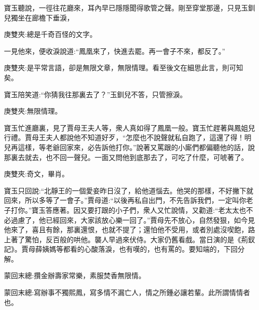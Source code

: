 \begin{parag}
    寶玉聽說，一徑往花廳來，耳內早已隱隱聞得歌管之聲。剛至穿堂那邊，只見玉釧兒獨坐在廊檐下垂淚，\begin{note}庚雙夾:總是千奇百怪的文字。\end{note}一見他來，便收淚說道:“鳳凰來了，快進去罷。再一會子不來，都反了。”\begin{note}庚雙夾:是平常言語，卻是無限文章，無限情理。看至後文在細思此言，則可知矣。\end{note}寶玉陪笑道:“你猜我往那裏去了？”玉釧兒不答，只管擦淚。\begin{note}庚雙夾:無限情理。\end{note}寶玉忙進廳裏，見了賈母王夫人等，衆人真如得了鳳凰一般。寶玉忙趕著與鳳姐兒行禮。賈母王夫人都說他不知道好歹，“怎麼也不說聲就私自跑了，這還了得！明兒再這樣，等老爺回家來，必告訴他打你。”說著又罵跟的小廝們都偏聽他的話，說那裏去就去，也不回一聲兒。一面又問他到底那去了，可吃了什麼，可唬著了。\begin{note}庚雙夾:奇文，畢肖。\end{note}寶玉只回說:“北靜王的一個愛妾昨日沒了，給他道惱去。他哭的那樣，不好撇下就回來，所以多等了一會子。”賈母道:“以後再私自出門，不先告訴我們，一定叫你老子打你。”寶玉答應著。因又要打跟的小子們，衆人又忙說情，又勸道:“老太太也不必過慮了，他已經回來，大家該放心樂一回了。”賈母先不放心，自然發狠，如今見他來了，喜且有餘，那裏還恨，也就不提了；還怕他不受用，或者別處沒喫飽，路上著了驚怕，反百般的哄他。襲人早過來伏侍。大家仍舊看戲。當日演的是《荊釵記》。賈母薛姨媽等都看的心酸落淚，也有嘆的，也有罵的。要知端的，下回分解。
\end{parag}


\begin{parag}
    \begin{note}蒙回末總:攢金辦壽家常樂，素服焚香無限情。\end{note}
\end{parag}


\begin{parag}
    \begin{note}蒙回末總:寫辦事不獨熙鳳，寫多情不漏亡人，情之所鍾必讓若輩。此所謂情情者也。\end{note}
\end{parag}


